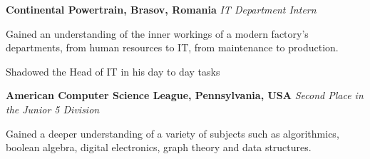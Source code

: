 
\bigskip
{}%
%
\textbf{Continental Powertrain, Brasov, Romania} \newline
\emph{IT Department Intern} 
\begin{itemize*}
  \item Gained an understanding of the inner workings of a modern factory's departments, from human resources to IT, from maintenance to production.
  \item Shadowed the Head of IT in his day to day tasks
\end{itemize*}


\smallskip
\textbf{American Computer Science League, Pennsylvania, USA} \newline
\emph{Second Place in the Junior 5 Division} 
\begin{itemize*}
  \item Gained a deeper understanding of a variety of subjects such as algorithmics, boolean algebra, digital electronics, graph theory and data structures.
\end{itemize*}
